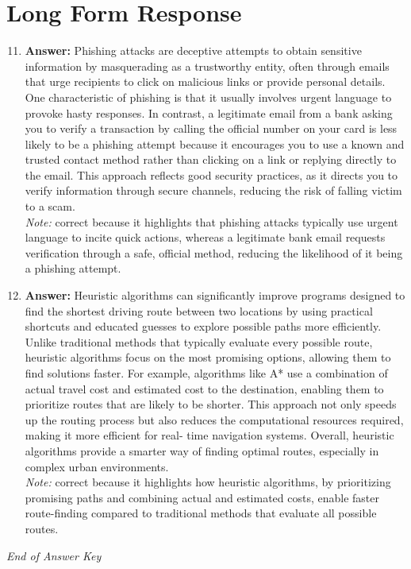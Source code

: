 \documentclass[12pt]{article}
\begin{document}
\section*{Long Form Response}
\begin{enumerate}[label=\arabic*.]
\setcounter{enumi}{10}
\item \textbf{Answer:} Phishing attacks are deceptive attempts to obtain sensitive information by masquerading as a trustworthy entity, often through emails that urge recipients to click on malicious links or provide personal details. One characteristic of phishing is that it usually involves urgent language to provoke hasty responses. In contrast, a legitimate email from a bank asking you to verify a transaction by calling the official number on your card is less likely to be a phishing attempt because it encourages you to use a known and trusted contact method rather than clicking on a link or replying directly to the email. This approach reflects good security practices, as it directs you to verify information through secure channels, reducing the risk of falling victim to a scam.
\\ \textit{Note:} correct because it highlights that phishing attacks typically use urgent language to incite quick actions, whereas a legitimate bank email requests verification through a safe, official method, reducing the likelihood of it being a phishing attempt.
\item \textbf{Answer:} Heuristic algorithms can significantly improve programs designed to find the shortest driving route between two locations by using practical shortcuts and educated guesses to explore possible paths more efficiently. Unlike traditional methods that typically evaluate every possible route, heuristic algorithms focus on the most promising options, allowing them to find solutions faster. For example, algorithms like A* use a combination of actual travel cost and estimated cost to the destination, enabling them to prioritize routes that are likely to be shorter. This approach not only speeds up the routing process but also reduces the computational resources required, making it more efficient for real- time navigation systems. Overall, heuristic algorithms provide a smarter way of finding optimal routes, especially in complex urban environments.
\\ \textit{Note:} correct because it highlights how heuristic algorithms, by prioritizing promising paths and combining actual and estimated costs, enable faster route-finding compared to traditional methods that evaluate all possible routes.
\end{enumerate}

\vfill
\noindent\textit{End of Answer Key}
\end{document}
